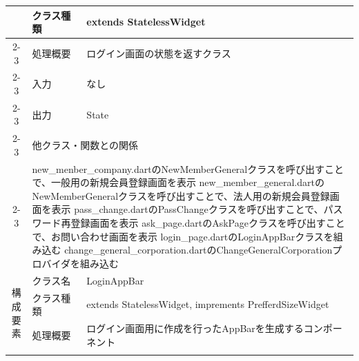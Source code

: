 \begin{table}[H]
\begin{tabular}{|c|l|l|}
                          & クラス種類                                                              & extends StatelessWidget                                     \\ \cline{2-3}
                          & 処理概要                                                               & \multicolumn{1}{p{12cm}|}{ログイン画面の状態を返すクラス}                  \\ \cline{2-3}
                          & 入力                                                                 & なし                                                          \\ \cline{2-3}
                          & 出力                                                                 & State                                                       \\ \cline{2-3}
                          & \multicolumn{2}{l|}{他クラス・関数との関係}                                                                                                 \\ \cline{2-3}
                          & \multicolumn{2}{p{14cm}|}{
      new\_menber\_company.dartのNewMemberGeneralクラスを呼び出すことで、一般用の新規会員登録画面を表示
      \newline new\_member\_general.dartのNewMemberGeneralクラスを呼び出すことで、法人用の新規会員登録画面を表示
      \newline pass\_change.dartのPassChangeクラスを呼び出すことで、パスワード再登録画面を表示
      \newline ask\_page.dartのAskPageクラスを呼び出すことで、お問い合わせ画面を表示
      \newline login\_page.dartのLoginAppBarクラスを組み込む
    \newline change\_general\_corporation.dartのChangeGeneralCorporationプロバイダを組み込む}                                                                             \\ \hline
    \multirow{7}{*}{構成要素} & クラス名                                                               & LoginAppBar                                                 \\ \cline{2-3}
                          & クラス種類                                                              & extends StatelessWidget, imprements PrefferdSizeWidget      \\ \cline{2-3}
                          & 処理概要                                                               & \multicolumn{1}{p{12cm}|}{ログイン画面用に作成を行ったAppBarを生成するコンポーネント} \\ \cline{2-3}

\end{tabular}
\end{table}
